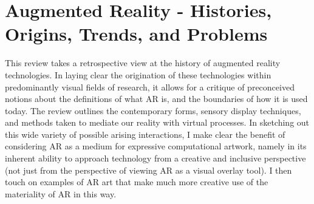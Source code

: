 \chapter{Augmented Reality - Histories, Origins, Trends, and Problems}
\label{sec: review}
\epigraph{\textit{}}{}
This review takes a retrospective view at the history of augmented reality technologies. In laying clear the origination of these technologies within predominantly visual fields of research, it allows for a critique of preconceived notions about the definitions of what AR is, and the boundaries of how it is used today. The review outlines the contemporary forms, sensory display techniques, and methods taken to mediate our reality with virtual processes. In sketching out this wide variety of possible arising interactions, I make clear the benefit of considering AR as a medium for expressive computational artwork, namely in its inherent ability to approach technology from a creative and inclusive perspective (not just from the perspective of viewing AR as a visual overlay tool). I then touch on examples of AR art that make much more creative use of the materiality of AR in this way.



